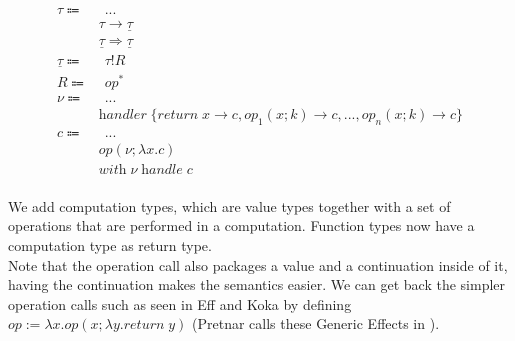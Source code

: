 \documentclass[12pt]{article}
\newcommand\eop[0]{\textit{op}}
\newcommand\eopa[0]{\textit{op}^*}
\newcommand\type[0]{\tau}
\newcommand\tarr[2]{#1 \rightarrow #2}
\newcommand\thandler[2]{#1 \Rightarrow #2}
\newcommand\ctype[0]{\underline{\type}}
\newcommand\cdirt[2]{#1 ! #2}
\newcommand\val[0]{\nu}
\newcommand\vabs[2]{\lambda #1 . #2}
\newcommand\vhandler[1]{\textit{handler} \; \{#1\}}
\newcommand\vhandlerc[0]{\vhandler{
	\textit{return} \; x \rightarrow \comp,
	\eop_1(x ; k) \rightarrow \comp,
	...,
	\eop_n(x ; k) \rightarrow \comp
}}
\newcommand\comp[0]{c}
\newcommand\creturn[1]{\textit{return} \; #1}
\newcommand\cop[4]{#1(#2 ; \lambda #3 . #4)}
\newcommand\chandle[2]{\textit{with} \; #1 \; \textit{handle} \; #2}
\begin{document}
\begin{align*}
	\type \Coloneqq 	& \hspace{5pt} ...					\tag{value types} \\
				& \tarr{\type}{\ctype}				\tag{type of functions}\\
				& \thandler{\ctype}{\ctype}			\tag{type of handlers} \\
	\ctype \Coloneqq	& \hspace{5pt} \cdirt{\type}{R}			\tag{computation types} \\
	R \Coloneqq		& \hspace{5pt} \eopa				\tag{effect annotations} \\
	\val \Coloneqq	& \hspace{5pt} ...					\tag{values} \\
				& \vhandlerc						\tag{handler} \\
	\comp \Coloneqq	&\hspace{5pt}  ...					\tag{computations} \\
				& \cop{\eop}{\val}{x}{\comp}			\tag{operation call} \\
				& \chandle{\val}{\comp}				\tag{handle computation} \\
\end{align*}

We add computation types, which are value types together with a set of operations that are performed in a computation.
Function types now have a computation type as return type. \\
Note that the operation call also packages a value and a continuation inside of it, having the continuation makes the semantics easier.
We can get back the simpler operation calls such as seen in Eff and Koka by defining $\eop := \vabs{x}{\cop{\eop}{x}{y}{\creturn{y}}}$ (Pretnar calls these Generic Effects in \cite{pretnar}).
\end{document}
